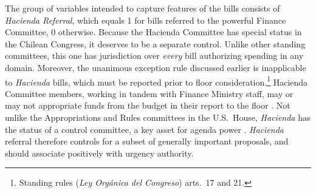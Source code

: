 \documentclass[letter,12pt]{article}
\begin{document}
The group of variables intended to capture features of the bills consists of \emph{Hacienda Referral}, which equals 1 for bills referred to the powerful Finance Committee, 0 otherwise. Because the Hacienda Committee has special status in the Chilean Congress, it deserves to be a separate control. Unlike other standing committees, this one has jurisdiction over \emph{every} bill authorizing spending in any domain. Moreover, the unanimous exception rule discussed earlier is inapplicable to \emph{Hacienda} bills, which must be reported prior to floor consideration.\footnote{Standing rules (\emph{Ley Orgánica del Congreso}) arts.\ 17 and 21.} %
Hacienda Committee members, working in tandem with Finance Ministry staff, may or may not appropriate funds from the budget in their report to the floor \citep{aleman.navia.UrgChi.2009}. Not unlike the Appropriations and Rules committees in the U.S.\ House, \emph{Hacienda} has the status of a control committee, a key asset for agenda power \citep{kiewiet.mccubbins.1991}. \emph{Hacienda} referral therefore controls for a subset of generally important proposals, and should associate positively with urgency authority. %
\end{document}
